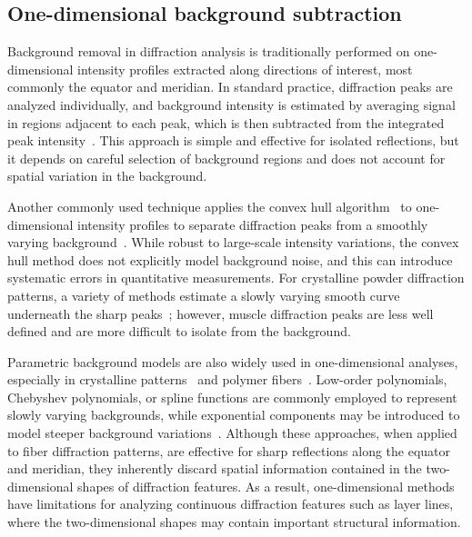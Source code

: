 \documentclass[iucr]{iucrjournals}
\begin{document}
\subsection{One-dimensional background subtraction}

Background removal in diffraction analysis is traditionally performed on one-dimensional intensity profiles extracted along directions of interest, most commonly the equator and meridian. In standard practice, diffraction peaks are analyzed individually, and background intensity is estimated by averaging signal in regions adjacent to each peak, which is then subtracted from the integrated peak intensity~\cite{NederKorsunskiy2018}. This approach is simple and effective for isolated reflections, but it depends on careful selection of background regions and does not account for spatial variation in the background.

Another commonly used technique applies the convex hull algorithm~\cite{jarvis1973convex_hull} to one-dimensional intensity profiles to separate diffraction peaks from a smoothly varying background~\cite{lee2019musclex}. While robust to large-scale intensity variations, the convex hull method does not explicitly model background noise, and this can introduce systematic errors in quantitative measurements. For crystalline powder diffraction patterns, a variety of methods estimate a slowly varying smooth curve underneath the sharp peaks~\cite{bruckner2000background, PolarBackground2024, ning2014beads, baek2015baseline, prescher2015dioptas}; however, muscle diffraction peaks are less well defined and are more difficult to isolate from the background.


Parametric background models are also widely used in one-dimensional analyses, especially in crystalline patterns~\cite{toby2013gsas2} and polymer fibers~\cite{grubb1992high_modulus_pe_fiber}. Low-order polynomials, Chebyshev polynomials, or spline functions are commonly employed to represent slowly varying backgrounds, while exponential components may be introduced to model steeper background variations~\cite{rajkumar2007fibrefix}. Although these approaches, when applied to fiber diffraction patterns, are effective for sharp reflections along the equator and meridian, they inherently discard spatial information contained in the two-dimensional shapes of diffraction features. As a result, one-dimensional methods have limitations for analyzing continuous diffraction features such as layer lines, where the two-dimensional shapes may contain important structural information.
\end{document}
